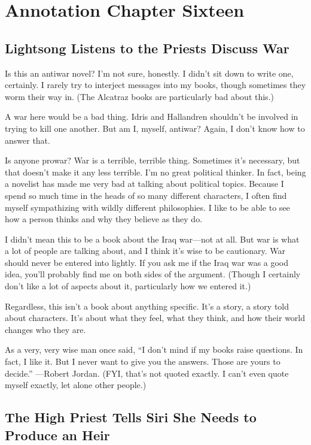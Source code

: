 \section{Annotation Chapter Sixteen}

\subsection*{Lightsong Listens to the Priests Discuss War}

Is this an antiwar novel? I’m not sure, honestly. I didn’t sit down to write one, certainly. I rarely try to interject messages into my books, though sometimes they worm their way in. (The Alcatraz books are particularly bad about this.)

A war here would be a bad thing. Idris and Hallandren shouldn’t be involved in trying to kill one another. But am I, myself, antiwar? Again, I don’t know how to answer that.

Is anyone prowar? War is a terrible, terrible thing. Sometimes it’s necessary, but that doesn’t make it any less terrible. I’m no great political thinker. In fact, being a novelist has made me very bad at talking about political topics. Because I spend so much time in the heads of so many different characters, I often find myself sympathizing with wildly different philosophies. I like to be able to see how a person thinks and why they believe as they do.

I didn’t mean this to be a book about the Iraq war—not at all. But war is what a lot of people are talking about, and I think it’s wise to be cautionary. War should never be entered into lightly. If you ask me if the Iraq war was a good idea, you’ll probably find me on both sides of the argument. (Though I certainly don’t like a lot of aspects about it, particularly how we entered it.)

Regardless, this isn’t a book about anything specific. It’s a story, a story told about characters. It’s about what they feel, what they think, and how their world changes who they are.

As a very, very wise man once said, “I don’t mind if my books raise questions. In fact, I like it. But I never want to give you the answers. Those are yours to decide.” —Robert Jordan. (FYI, that’s not quoted exactly. I can’t even quote myself exactly, let alone other people.)

\subsection*{The High Priest Tells Siri She Needs to Produce an Heir}

